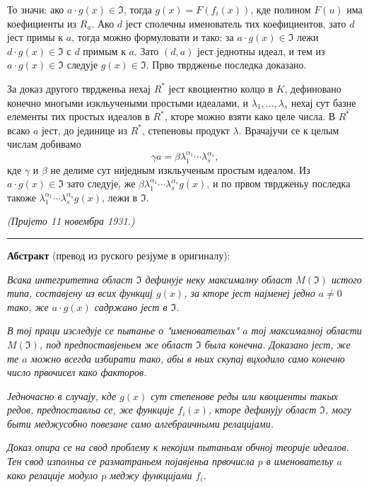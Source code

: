 \documentclass[11pt]{article}
\begin{document}
То значи: ако \(a\cdot g(x)\in\mathfrak{I}\), тогда \(g(x)=F(f_i(x))\), кде полином \(F(u)\) има коефициенты из \(R_a\). Ако \(d\) јест сполечны именователь тих коефициентов, зато \(d\) јест примы к \(a\), тогда можно формуловати и тако: за \(a\cdot g(x)\in\mathfrak{I}\) лежи \(d\cdot g(x)\in\mathfrak{I}\) с \(d\) примым к \(a\). Зато \((d,a)\) јест једнотны идеал, и тем из \(a\cdot g(x)\in\mathfrak{I}\) следује \(g(x)\in\mathfrak{I}\). Прво тврдженье последка доказано.

За доказ другого тврдженьа нехај \(R^*\) јест квоциентно колцо в \(K\), дефиновано конечно многыми изкльучеными простыми идеалами, и \(\lambda_1,\ldots,\lambda_s\) нехај сут базне елементы тих простых идеалов в \(R^*\), кторе можно взяти како целе числа. В \(R^*\) всако \(a\) јест, до јединице из \(R^*\), степеновы продукт \(\lambda\). Врачајучи се к целым числам добивамо
\[
\gamma a=\beta\lambda_1^{\alpha_1}\cdots\lambda_s^{\alpha_s},
\]
кде \(\gamma\) и \(\beta\) не делиме сут ниједным изкльученым простым идеалом. Из \(a\cdot g(x)\in\mathfrak{I}\) зато следује, же \(\beta\lambda_1^{\alpha_1}\cdots\lambda_s^{\alpha_s}g(x)\), и по првом тврдженьу последка такоже \(\lambda_1^{\alpha_1}\cdots\lambda_s^{\alpha_s}g(x)\), лежи в \(\mathfrak{I}\).

\begin{flushright}
\textit{(Пријето 11 новембра 1931.)}
\end{flushright}

\bigskip
\noindent\rule{\textwidth}{0.4pt}

\medskip
\noindent\textbf{Абстракт} (превод из руского резјуме в оригиналу):

\smallskip
\textit{Всака интегритетна област \(\mathfrak{I}\) дефинује неку максималну област \(M(\mathfrak{I})\) истого типа, составјену из всих функциј \(g(x)\), за кторе јест најменеј једно \(a\ne0\) тако, же \(a\cdot g(x)\) садржано јест в \(\mathfrak{I}\).}

\textit{В тој праци изследује се пытанье о "именовательах" \(a\) тој максималној области \(M(\mathfrak{I})\), под предпоставјеньем же област \(\mathfrak{I}\) была конечна. Доказано јест, же те \(a\) можно всегда избирати тако, абы в ньих скупај вцходило само конечно число првочисел како факторов.}

\textit{Једночасно в случају, кде \(g(x)\) сут степенове реды или квоциенты такых редов, предпоставльа се, же функције \(f_i(x)\), кторе дефинују област \(\mathfrak{I}\), могу быти меджусобно повезане само алгебраичными релацијами.}

\textit{Доказ опира се на свод проблему к некојим пытаньам обчној теорије идеалов. Тен свод изполньа се разматраньем појавјеньа првочисла \(p\) в именовательу \(a\) како релације модуло \(p\) меджу функцијами \(f_i\).}
\end{document}
